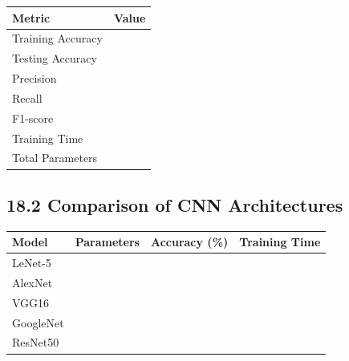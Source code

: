 \documentclass[11pt]{article}
\begin{document}
\begin{center}

\begin{tabular}{|p{5cm}|p{4cm}|}

\hline

Metric & Value\\

\hline

Training Accuracy & \\

\hline

Testing Accuracy & \\

\hline

Precision & \\

\hline

Recall & \\

\hline

F1-score & \\

\hline

Training Time & \\

\hline

Total Parameters & \\

\hline

\end{tabular}

\end{center}

\vspace{5mm}

\subsection*{18.2 Comparison of CNN Architectures}

\begin{center}

\begin{tabular}{|l|c|c|c|}

\hline

Model &
Parameters &
Accuracy (\%) &
Training Time\\

\hline

LeNet-5 &&&\\

\hline

AlexNet &&&\\

\hline

VGG16 &&&\\

\hline

GoogleNet &&&\\

\hline

ResNet50 &&&\\

\hline

\end{tabular}

\end{center}
\end{document}
